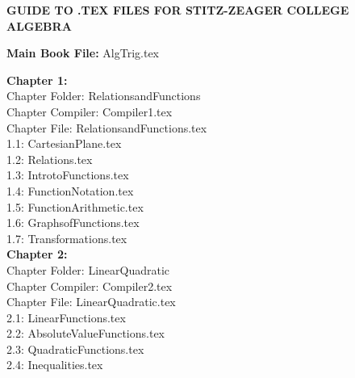 \documentclass[11pt]{book}
\theoremstyle{definition}  %
\begin{document}
\centerline{\textbf{GUIDE TO .TEX FILES FOR STITZ-ZEAGER COLLEGE ALGEBRA}}

\vspace{.125in}

\textbf{Main Book File:}  AlgTrig.tex \\

\begin{multicols}{2} \raggedcolumns

\textbf{Chapter 1:} \\


Chapter Folder:  RelationsandFunctions \\

Chapter Compiler:  Compiler1.tex \\

Chapter File:  RelationsandFunctions.tex \\


1.1:  CartesianPlane.tex \\

1.2:  Relations.tex \\

1.3:  IntrotoFunctions.tex \\

1.4:  FunctionNotation.tex \\

1.5:  FunctionArithmetic.tex \\

1.6:  GraphsofFunctions.tex \\

1.7:  Transformations.tex \\





\textbf{Chapter 2:} \\


Chapter Folder:  LinearQuadratic \\

Chapter Compiler:  Compiler2.tex \\

Chapter File:  LinearQuadratic.tex \\

2.1:  LinearFunctions.tex \\

2.2:  AbsoluteValueFunctions.tex \\

2.3:  QuadraticFunctions.tex \\

2.4:  Inequalities.tex \\


\end{multicols}
\end{document}
